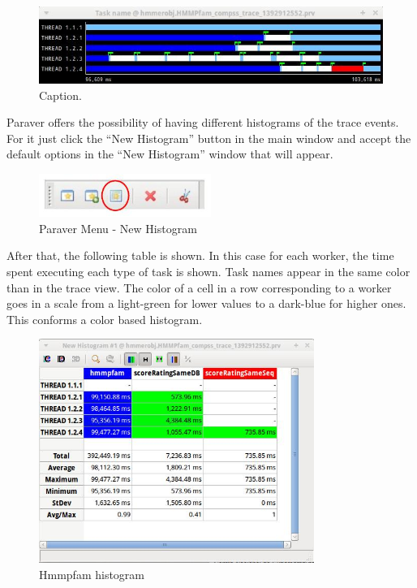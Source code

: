 \begin{figure}[ht!]
  \centering
    \includegraphics[width=1.0\textwidth]{./Sections/5_Analysis/Figures/11.jpeg}
    \caption{Caption.}
\end{figure} 
 
Paraver offers the possibility of having different histograms of the trace events. 
For it just click the ``New Histogram'' button in the main window and accept the 
default options in the ``New Histogram'' window that will appear.

\begin{figure}[ht!]
  \centering
    \includegraphics[width=0.5\textwidth]{./Sections/5_Analysis/Figures/12.jpeg}
    \caption{Paraver Menu - New Histogram}
\end{figure}

After that, the following table is shown. In this case for each worker, the time spent 
executing each type of task is shown. Task names appear in the same color than in the 
trace view. The color of a cell in a row corresponding to a worker goes in a scale from 
a light-green for lower values to a dark-blue for higher ones. This conforms a color based histogram.

\begin{figure}[ht!]
  \centering
    \includegraphics[width=0.8\textwidth]{./Sections/5_Analysis/Figures/13.jpeg}
    \caption{Hmmpfam histogram}
\end{figure}
 
